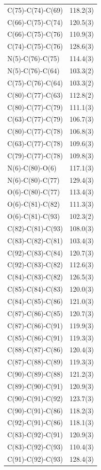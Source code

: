 \begin{center}
{\begin{supertabular}{p{1.5in}c}
C(75)-C(74)-C(69)&118.2(3)\\
C(66)-C(75)-C(74)&120.5(3)\\
C(66)-C(75)-C(76)&110.9(3)\\
C(74)-C(75)-C(76)&128.6(3)\\
N(5)-C(76)-C(75)&114.4(3)\\
N(5)-C(76)-C(64)&103.3(2)\\
C(75)-C(76)-C(64)&103.3(2)\\
C(80)-C(77)-C(63)&112.8(2)\\
C(80)-C(77)-C(79)&111.1(3)\\
C(63)-C(77)-C(79)&106.7(3)\\
C(80)-C(77)-C(78)&106.8(3)\\
C(63)-C(77)-C(78)&109.6(3)\\
C(79)-C(77)-C(78)&109.8(3)\\
N(6)-C(80)-O(6)&117.1(3)\\
N(6)-C(80)-C(77)&129.4(3)\\
O(6)-C(80)-C(77)&113.4(3)\\
O(6)-C(81)-C(82)&111.3(3)\\
O(6)-C(81)-C(93)&102.3(2)\\
C(82)-C(81)-C(93)&108.0(3)\\
C(83)-C(82)-C(81)&103.4(3)\\
C(92)-C(83)-C(84)&120.7(3)\\
C(92)-C(83)-C(82)&112.6(3)\\
C(84)-C(83)-C(82)&126.5(3)\\
C(85)-C(84)-C(83)&120.0(3)\\
C(84)-C(85)-C(86)&121.0(3)\\
C(87)-C(86)-C(85)&120.7(3)\\
C(87)-C(86)-C(91)&119.9(3)\\
C(85)-C(86)-C(91)&119.3(3)\\
C(88)-C(87)-C(86)&120.4(3)\\
C(87)-C(88)-C(89)&119.3(3)\\
C(90)-C(89)-C(88)&121.2(3)\\
C(89)-C(90)-C(91)&120.9(3)\\
C(90)-C(91)-C(92)&123.7(3)\\
C(90)-C(91)-C(86)&118.2(3)\\
C(92)-C(91)-C(86)&118.1(3)\\
C(83)-C(92)-C(91)&120.9(3)\\
C(83)-C(92)-C(93)&110.4(3)\\
C(91)-C(92)-C(93)&128.4(3)\\

\end{supertabular}}
\end{center}
